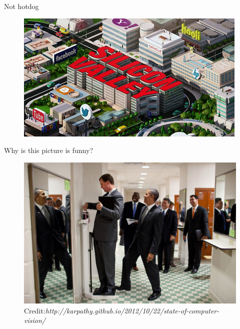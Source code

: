
\begin{frame}{Not hotdog}
	\begin{figure}
		\includegraphics[width=.87\textwidth, center]{figures/silicon_valley_title}
		\caption*{\href{https://www.youtube.com/watch_popup?v=vIci3C4JkL0}{}}		
	\end{figure}

\end{frame}

\begin{frame}{\hypertarget{obama_funny_pic}{Why is this picture is funny?}}
	\begin{figure}
		\includegraphics[width=.87\textwidth, center]{figures/obama-funny}
		\caption*{{\tiny Credit:{\em http://karpathy.github.io/2012/10/22/state-of-computer-vision/}}}
	\end{figure}
\end{frame}
